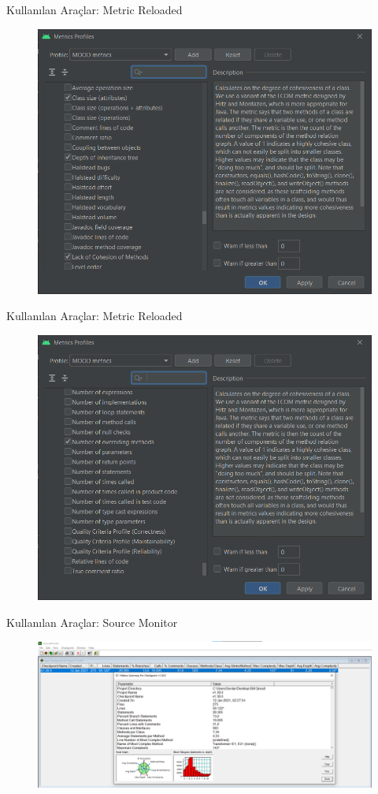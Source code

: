 \documentclass[compress,xcolor=table]{beamer}
\begin{document}
        \begin{frame}{Kullanılan Araçlar: Metric Reloaded}
\begin{figure}
\vspace{-.8cm}
   \includegraphics[width = \textwidth, height = 7.4 cm]{QMOODimage/android-metrik-5.png}
\end{figure}
\end{frame}
        
        \begin{frame}{Kullanılan Araçlar: Metric Reloaded}
\begin{figure}
\vspace{-.8cm}
   \includegraphics[width = \textwidth, height = 7.4 cm]{QMOODimage/android-metrik-6.png}
\end{figure}
\end{frame}
        
        \begin{frame}{Kullanılan Araçlar: Source Monitor}

\begin{figure}
\vspace{-.8cm}
   \includegraphics[width = \textwidth, height = 6.0 cm]{QMOODimage/grafik 2.png}
\end{figure}

\end{frame}
\end{document}
